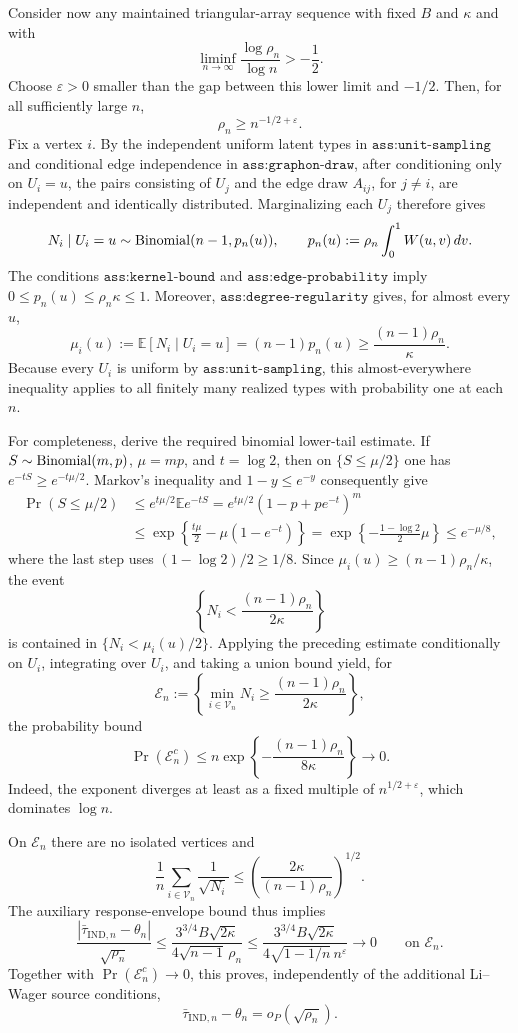 Consider now any maintained triangular-array sequence with fixed \(B\) and \(\kappa\) and with
\[
 \liminf_{n\to\infty}\frac{\log\rho_n}{\log n}>-\frac12.
\]
Choose \(\varepsilon>0\) smaller than the gap between this lower limit and \(-1/2\). Then, for all sufficiently large \(n\),
\[
 \rho_n\ge n^{-1/2+\varepsilon}.
\]
Fix a vertex \(i\). By the independent uniform latent types in \(\texttt{ass:unit-sampling}\) and conditional edge independence in \(\texttt{ass:graphon-draw}\), after conditioning only on \(U_i=u\), the pairs consisting of \(U_j\) and the edge draw \(A_{ij}\), for \(j\ne i\), are independent and identically distributed. Marginalizing each \(U_j\) therefore gives
\[
 N_i\mid U_i=u\sim {\rm Binomial}(n-1,p_n(u)),
 \qquad
 p_n(u):=\rho_n\int_0^1W(u,v)\,dv.
\]
The conditions \(\texttt{ass:kernel-bound}\) and \(\texttt{ass:edge-probability}\) imply \(0\le p_n(u)\le\rho_n\kappa\le1\). Moreover, \(\texttt{ass:degree-regularity}\) gives, for almost every \(u\),
\[
 \mu_i(u):=\mathbb E[N_i\mid U_i=u]
 =(n-1)p_n(u)
 \ge\frac{(n-1)\rho_n}{\kappa}.
\]
Because every \(U_i\) is uniform by \(\texttt{ass:unit-sampling}\), this almost-everywhere inequality applies to all finitely many realized types with probability one at each \(n\).

For completeness, derive the required binomial lower-tail estimate. If \(S\sim{\rm Binomial}(m,p)\), \(\mu=mp\), and \(t=\log2\), then on \(\{S\le\mu/2\}\) one has \(e^{-tS}\ge e^{-t\mu/2}\). Markov's inequality and \(1-y\le e^{-y}\) consequently give
\[
\begin{aligned}
 \Pr(S\le\mu/2)
 &\le e^{t\mu/2}\mathbb E e^{-tS}
 =e^{t\mu/2}(1-p+pe^{-t})^m\\
 &\le\exp\!\left\{\frac{t\mu}{2}-\mu(1-e^{-t})\right\}
 =\exp\!\left\{-\frac{1-\log2}{2}\mu\right\}
 \le e^{-\mu/8},
\end{aligned}
\]
where the last step uses \((1-\log2)/2\ge1/8\). Since \(\mu_i(u)\ge(n-1)\rho_n/\kappa\), the event
\[
 \left\{N_i<\frac{(n-1)\rho_n}{2\kappa}\right\}
\]
is contained in \(\{N_i<\mu_i(u)/2\}\). Applying the preceding estimate conditionally on \(U_i\), integrating over \(U_i\), and taking a union bound yield, for
\[
 \mathcal E_n:=\left\{\min_{i\in\mathcal V_n}N_i
 \ge\frac{(n-1)\rho_n}{2\kappa}\right\},
\]
the probability bound
\[
 \Pr(\mathcal E_n^c)
 \le n\exp\!\left\{-\frac{(n-1)\rho_n}{8\kappa}\right\}
 \longrightarrow0.
\]
Indeed, the exponent diverges at least as a fixed multiple of \(n^{1/2+\varepsilon}\), which dominates \(\log n\).

On \(\mathcal E_n\) there are no isolated vertices and
\[
 \frac1n\sum_{i\in\mathcal V_n}\frac1{\sqrt{N_i}}
 \le\left(\frac{2\kappa}{(n-1)\rho_n}\right)^{1/2}.
\]
The auxiliary response-envelope bound thus implies
\[
 \frac{\left|\bar\tau_{\mathrm{IND},n}-\theta_n\right|}{\sqrt{\rho_n}}
 \le\frac{3^{3/4}B\sqrt{2\kappa}}{4\sqrt{n-1}\,\rho_n}
 \le\frac{3^{3/4}B\sqrt{2\kappa}}{4\sqrt{1-1/n}\,n^{\varepsilon}}
 \longrightarrow0
 \qquad\text{on }\mathcal E_n.
\]
Together with \(\Pr(\mathcal E_n^c)\to0\), this proves, independently of the additional Li--Wager source conditions,
\[
 \bar\tau_{\mathrm{IND},n}-\theta_n=o_P(\sqrt{\rho_n}).
\]

